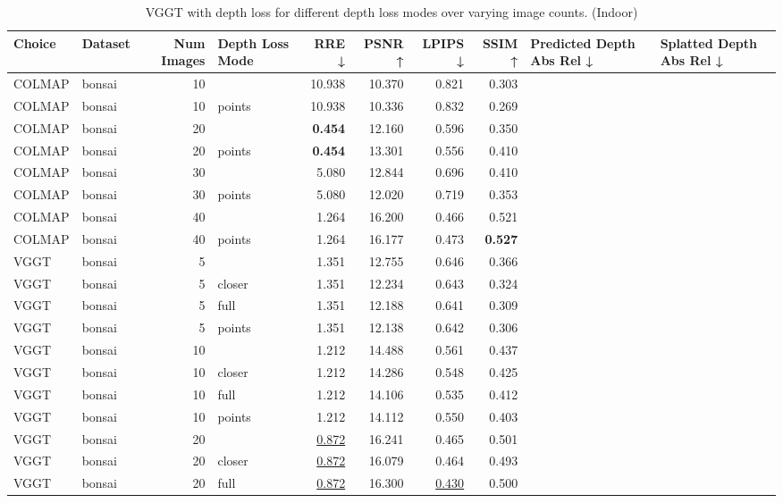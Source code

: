 \begin{table}[H]
\caption{VGGT with depth loss for different depth loss modes over varying image counts. (Indoor)}
\label{tab:05_depth_loss_num_images_indoor}
\centering
\scriptsize
\begin{tabular}{llrlrrrrll}
\toprule
Choice & Dataset & Num Images & Depth Loss Mode & RRE ↓ & PSNR ↑ & LPIPS ↓ & SSIM ↑ & Predicted Depth Abs Rel ↓ & Splatted Depth Abs Rel ↓ \\
\midrule
COLMAP & bonsai & 10 &  & 10.938 & 10.370 & 0.821 & 0.303 &  &  \\
COLMAP & bonsai & 10 & points & 10.938 & 10.336 & 0.832 & 0.269 &  &  \\
COLMAP & bonsai & 20 &  & \textbf{0.454} & 12.160 & 0.596 & 0.350 &  &  \\
COLMAP & bonsai & 20 & points & \textbf{0.454} & 13.301 & 0.556 & 0.410 &  &  \\
COLMAP & bonsai & 30 &  & 5.080 & 12.844 & 0.696 & 0.410 &  &  \\
COLMAP & bonsai & 30 & points & 5.080 & 12.020 & 0.719 & 0.353 &  &  \\
COLMAP & bonsai & 40 &  & 1.264 & 16.200 & 0.466 & 0.521 &  &  \\
COLMAP & bonsai & 40 & points & 1.264 & 16.177 & 0.473 & \textbf{0.527} &  &  \\
VGGT & bonsai & 5 &  & 1.351 & 12.755 & 0.646 & 0.366 &  &  \\
VGGT & bonsai & 5 & closer & 1.351 & 12.234 & 0.643 & 0.324 &  &  \\
VGGT & bonsai & 5 & full & 1.351 & 12.188 & 0.641 & 0.309 &  &  \\
VGGT & bonsai & 5 & points & 1.351 & 12.138 & 0.642 & 0.306 &  &  \\
VGGT & bonsai & 10 &  & 1.212 & 14.488 & 0.561 & 0.437 &  &  \\
VGGT & bonsai & 10 & closer & 1.212 & 14.286 & 0.548 & 0.425 &  &  \\
VGGT & bonsai & 10 & full & 1.212 & 14.106 & 0.535 & 0.412 &  &  \\
VGGT & bonsai & 10 & points & 1.212 & 14.112 & 0.550 & 0.403 &  &  \\
VGGT & bonsai & 20 &  & \underline{0.872} & 16.241 & 0.465 & 0.501 &  &  \\
VGGT & bonsai & 20 & closer & \underline{0.872} & 16.079 & 0.464 & 0.493 &  &  \\
VGGT & bonsai & 20 & full & \underline{0.872} & 16.300 & \underline{0.430} & 0.500 &  &  \\

\end{tabular}
\end{table}
